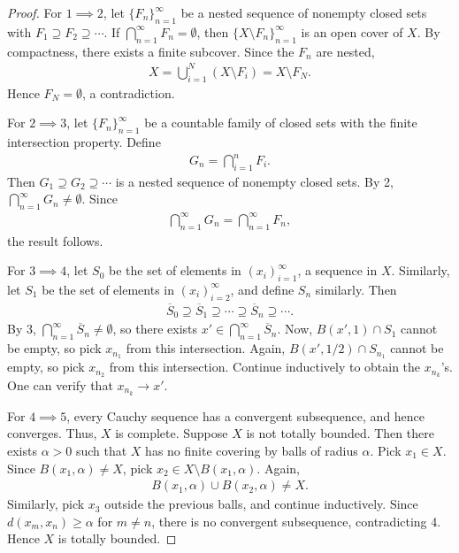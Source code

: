 \begin{proof}
    For $1 \implies 2$, let $\{F_n\}_{n=1}^{\infty}$ be a nested sequence of nonempty closed sets with $F_1 \supseteq F_2 \supseteq \cdots$. If $\bigcap_{n=1}^{\infty}F_n=\emptyset$, then $\{X\setminus F_n\}_{n=1}^{\infty}$ is an open cover of $X$. By compactness, there exists a finite subcover. Since the $F_n$ are nested,
    \begin{align}
        X=\bigcup_{i=1}^{N}(X\setminus F_i)=X\setminus F_N.
    \end{align}
    Hence $F_N=\emptyset$, a contradiction.

    For $2 \implies 3$, let $\{F_n\}_{n=1}^{\infty}$ be a countable family of closed sets with the finite intersection property. Define
    \begin{align}
        G_n=\bigcap_{i=1}^{n}F_i.
    \end{align}
    Then $G_1\supseteq G_2\supseteq\cdots$ is a nested sequence of nonempty closed sets. By 2, $\bigcap_{n=1}^{\infty}G_n\neq\emptyset$. Since
    \begin{align}
        \bigcap_{n=1}^{\infty}G_n=\bigcap_{n=1}^{\infty}F_n,
    \end{align}
    the result follows.

    For $3 \implies 4$, let $S_0$ be the set of elements in $(x_i)_{i=1}^{\infty}$, a sequence in $X$. Similarly, let $S_1$ be the set of elements in $(x_i)_{i=2}^{\infty}$, and define $S_n$ similarly. Then
    \begin{align}
        \overline{S}_0\supseteq\overline{S}_1\supseteq\cdots\supseteq\overline{S}_n\supseteq\cdots.
    \end{align}
    By 3, $\bigcap_{n=1}^{\infty}\overline{S}_n\neq\emptyset$, so there exists $x'\in\bigcap_{n=1}^{\infty}\overline{S}_n$. Now, $B(x',1)\cap S_1$ cannot be empty, so pick $x_{n_1}$ from this intersection. Again, $B(x',1/2)\cap S_{n_1}$ cannot be empty, so pick $x_{n_2}$ from this intersection. Continue inductively to obtain the $x_{n_k}$'s. One can verify that $x_{n_k}\to x'$.

    For $4 \implies 5$, every Cauchy sequence has a convergent subsequence, and hence converges. Thus, $X$ is complete. Suppose $X$ is not totally bounded. Then there exists $\alpha>0$ such that $X$ has no finite covering by balls of radius $\alpha$. Pick $x_1\in X$. Since $B(x_1,\alpha)\neq X$, pick $x_2\in X\setminus B(x_1,\alpha)$. Again,
    \begin{align}
        B(x_1,\alpha)\cup B(x_2,\alpha)\neq X.
    \end{align}
    Similarly, pick $x_3$ outside the previous balls, and continue inductively. Since $d(x_m,x_n)\ge\alpha$ for $m\neq n$, there is no convergent subsequence, contradicting 4. Hence $X$ is totally bounded.


\end{proof}

